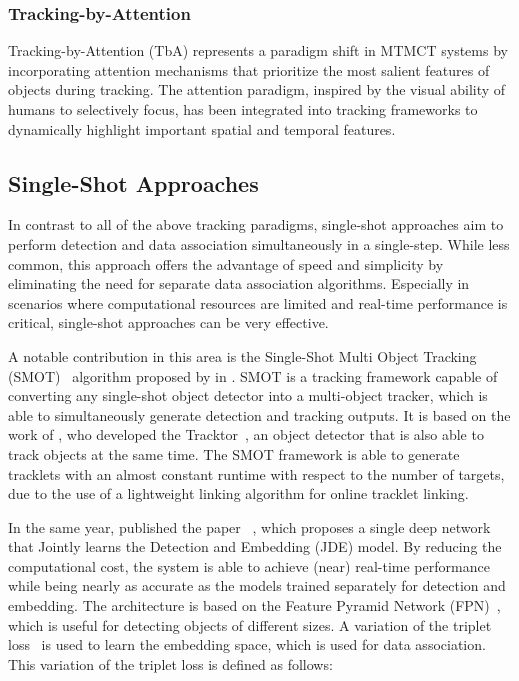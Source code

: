 \subsubsection{Tracking-by-Attention}\label{subsubsec:tracking_by_attention}Tracking-by-Attention (TbA) represents a paradigm shift in MTMCT systems by incorporating attention mechanisms that prioritize the most salient features of objects during tracking. The attention paradigm, inspired by the visual ability of humans to selectively focus, has been integrated into tracking frameworks to dynamically highlight important spatial and temporal features.

\subsection{Single-Shot Approaches}\label{subsec:single-shot_approaches}
In contrast to all of the above tracking paradigms, single-shot approaches aim to perform detection and data association simultaneously in a single-step. While less common, this approach offers the advantage of speed and simplicity by eliminating the need for separate data association algorithms. Especially in scenarios where computational resources are limited and real-time performance is critical, single-shot approaches can be very effective.

A notable contribution in this area is the Single-Shot Multi Object Tracking (SMOT)~\cite{Li20} algorithm proposed by \citeauthor{Li20} in \citeyear{Li20}. SMOT is a tracking framework capable of converting any single-shot object detector into a multi-object tracker, which is able to simultaneously generate detection and tracking outputs. It is based on the work of \citeauthor{Bergmann19}, who developed the Tracktor~\cite{Bergmann19}, an object detector that is also able to track objects at the same time. The SMOT framework is able to generate tracklets with an almost constant runtime with respect to the number of targets, due to the use of a lightweight linking algorithm for online tracklet linking.

In the same year, \citeauthor{Wang20a} published the paper ~\cite{Wang20a}, which proposes a single deep network that Jointly learns the Detection and Embedding (JDE) model. By reducing the computational cost, the system is able to achieve (near) real-time performance while being nearly as accurate as the models trained separately for detection and embedding. The architecture is based on the Feature Pyramid Network (FPN)~\cite{Lin17}, which is useful for detecting objects of different sizes. A variation of the triplet loss~\cite{Schroff15} is used to learn the embedding space, which is used for data association. This variation of the triplet loss is defined as follows:

